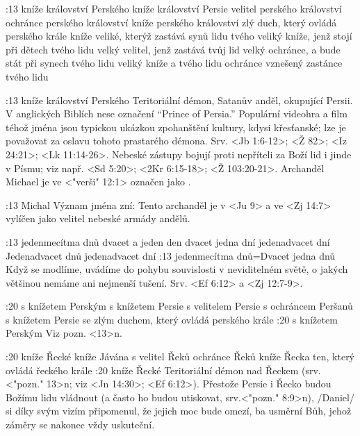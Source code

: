 :13  
    {kníže království Perského}   %
    {kníže království Persie}   %
    {velitel perského království}   %
    {ochránce perského království}   %
    {kníže perského království}   %
    {zlý duch, který ovládá perského krále}   %
\vdef   
    {kníže veliké, kterýž zastává synů lidu tvého}   %
    {veliký kníže, jenž stojí při dětech tvého lidu}   %
    {velký velitel, jenž zastává tvůj lid}   %
    {velký ochránce, a bude stát při synech tvého lidu}   %
    {veliký kníže a tvého lidu ochránce}   %
    {vznešený zastánce tvého lidu}   %
    
:13 {kníže království Perského} Teritoriální démon, Satanův anděl, okupující Persii. V anglických Biblích nese označení ``Prince of Persia.'' Populární videohra a film téhož jména jsou typickou ukázkou zpohanštění kultury, kdysi křesťanské; lze je považovat za oslavu tohoto prastarého démona.
Srv. <Jb 1:6-12>; <Ž 82>; <Iz 24:21>; <Lk 11:14-26>. Nebeské zástupy bojují proti nepříteli za Boží lid  i jinde v Písmu; viz např. <Sd 5:20>;  <2Kr 6:15-18>;  <Ž 103:20-21>. Archanděl Michael je ve  <"verši" 12:1> označen jako  .


:13 {Michal} Význam jména zní:  Tento archanděl je v <Ju 9> a ve <Zj 14:7>   vylíčen jako velitel nebeské armády andělů. 

:13  
    {jedenmecítma dnů}   %
    {dvacet a jeden den} %
    {dvacet jedna dní}   %
    {jedenadvacet dní}   %
    {Jedenadvacet dnů}   %
    {jedenadvacet dní}   %
:13 {jedenmecítma dnů}={Dvacet jedna dnů} Když se modlíme, uvádíme do pohybu souvislosti v neviditelném světě, o jakých většinou nemáme ani nejmenší tušení. Srv. <Ef 6:12> a <Zj 12:7-9>.

:20
    {s knížetem Perským}   %
    {s knížetem Persie}   %
    {s velitelem Persie}   %
    {s ochráncem Peršanů}   %
    {s knížetem Persie}   %
    {se zlým duchem, který ovládá perského krále}   %
:20 {s knížetem Perským} Viz pozn. <13>n.

:20
    {kníže Řecké}   %
    {kníže Jávána}   %
    {s velitel Řeků}   %
    {ochránce Řeků}   %
    {kníže Řecka}   %
    {ten, který ovládá řeckého krále}   %
:20 {kníže Řecké} Teritoriální démon nad Řeckem (srv. <"pozn." 13>n; viz <Jn 14:30>; <Ef 6:12>). Přestože Persie i Řecko budou Božímu lidu vládnout (a často ho budou utiskovat, srv.<"pozn." 8:9>n),  \x/Daniel/ si díky svým vizím připomenul, že jejich moc bude omezí, ba usměrní Bůh, jehož záměry se nakonec vždy uskuteční.


